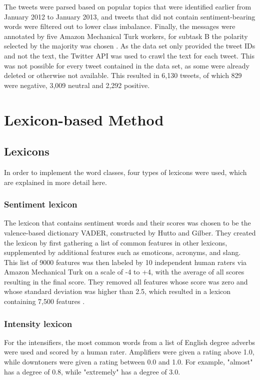 The tweets were parsed based on popular topics that were identified earlier from January 2012 to January 2013, and tweets that did not contain sentiment-bearing words were filtered out to lower class imbalance. Finally, the messages were annotated by five Amazon Mechanical Turk workers, for subtask B the polarity selected by the majority was chosen \cite{nakov-etal-2013-semeval}. As the data set only provided the tweet IDs and not the text, the Twitter API was used to crawl the text for each tweet. This was not possible for every tweet contained in the data set, as some were already deleted or otherwise not available. This resulted in 6,130 tweets, of which 829 were negative, 3,009 neutral and 2,292 positive.

\section{Lexicon-based Method}

\subsection{Lexicons}
In order to implement the word classes, four types of lexicons were used, which are explained in more detail here.

\subsubsection{Sentiment lexicon}
The lexicon that contains sentiment words and their scores was chosen to be the valence-based dictionary VADER, constructed by Hutto and Gilber. They created the lexicon by first gathering a list of common features in other lexicons, supplemented by additional features such as emoticons, acronyms, and slang. This list of 9000 features was then labeled by 10 independent human raters via Amazon Mechanical Turk on a scale of -4 to +4, with the average of all scores resulting in the final score. They removed all features whose score was zero and whose standard deviation was higher than 2.5, which resulted in a lexicon containing 7,500 features \cite{DBLP:conf/icwsm/HuttoG14}.

\subsubsection{Intensity lexicon}
For the intensifiers, the most common words from a list of English degree adverbs \cite{wiki:adverbs} were used and scored by a human rater. Amplifiers were given a rating above 1.0, while downtoners were given a rating between 0.0 and 1.0. For example, "almost" has a degree of 0.8, while "extremely" has a degree of 3.0.


